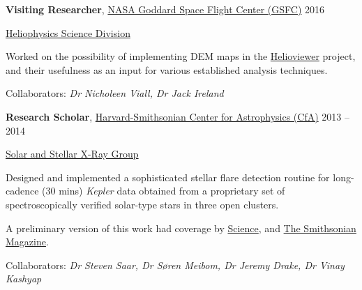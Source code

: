 \documentclass[10pt]{article}
\newcommand{\halfblankline}{\quad\vspace{-0.5\baselineskip}\pagebreak[3]}
\begin{document}
\textbf{Visiting Researcher},
	\href{https://www.nasa.gov/goddard}{NASA Goddard Space Flight Center (GSFC)} \hfill {2016}
\begin{innerlist}

    \item[] \href{https://science.gsfc.nasa.gov/heliophysics/}{Heliophysics Science Division}
    \begin{innerlist}
    	\item{} Worked on the possibility of implementing DEM maps in the \href{www.helioviewer.org}{Helioviewer} project, and their usefulness as an input for various established analysis techniques.
    \end{innerlist}
        	\item[] Collaborators: {\it Dr Nicholeen Viall, Dr Jack Ireland}

\end{innerlist}

\halfblankline

 \textbf{Research Scholar},
	\href{https://www.cfa.harvard.edu/}{Harvard-Smithsonian Center for Astrophysics (CfA)} \hfill {2013 -- 2014}
\begin{innerlist}

    \item[] \href{https://www.cfa.harvard.edu/research/hea/sun}{Solar and Stellar X-Ray Group}
    \begin{innerlist}
    	\item{} Designed and implemented a sophisticated stellar flare detection routine for long-cadence (30 mins) {\it Kepler} data obtained from a proprietary set of spectroscopically verified solar-type stars in three open clusters.\item{} A preliminary version of this work had coverage by \href{http://www.sciencemag.org/news/2015/08/when-sun-s-next-superflare-due?rss=1}{Science}, and \href{http://www.smithsonianmag.com/smart-news/when-next-solar-superflare-hit-earth-180956288/}{The Smithsonian Magazine}.%
    \end{innerlist}    	
    	\item[] Collaborators: {\it Dr Steven Saar, Dr S{\o}ren Meibom, Dr Jeremy Drake, Dr Vinay Kashyap}

\end{innerlist}

 
%
\end{document}
